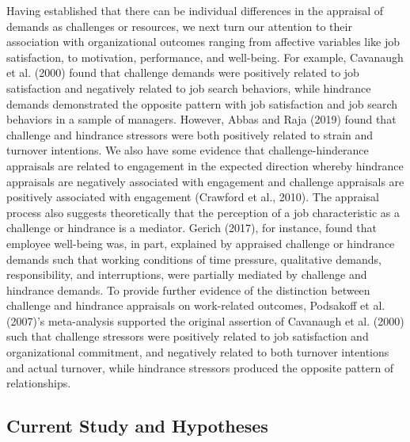 \documentclass[
  man]{apa6}
\begin{document}
Having established that there can be individual differences in the appraisal of demands as challenges or resources, we next turn our attention to their association with organizational outcomes ranging from affective variables like job satisfaction, to motivation, performance, and well-being. For example, Cavanaugh et al. (2000) found that challenge demands were positively related to job satisfaction and negatively related to job search behaviors, while hindrance demands demonstrated the opposite pattern with job satisfaction and job search behaviors in a sample of managers. However, Abbas and Raja (2019) found that challenge and hindrance stressors were both positively related to strain and turnover intentions. We also have some evidence that challenge-hinderance appraisals are related to engagement in the expected direction whereby hindrance appraisals are negatively associated with engagement and challenge appraisals are positively associated with engagement (Crawford et al., 2010). The appraisal process also suggests theoretically that the perception of a job characteristic as a challenge or hindrance is a mediator. Gerich (2017), for instance, found that employee well-being was, in part, explained by appraised challenge or hindrance demands such that working conditions of time pressure, qualitative demands, responsibility, and interruptions, were partially mediated by challenge and hindrance demands. To provide further evidence of the distinction between challenge and hindrance appraisals on work-related outcomes, Podsakoff et al. (2007)'s meta-analysis supported the original assertion of Cavanaugh et al. (2000) such that challenge stressors were positively related to job satisfaction and organizational commitment, and negatively related to both turnover intentions and actual turnover, while hindrance stressors produced the opposite pattern of relationships.

\hypertarget{current-study-and-hypotheses}{%
\subsection{Current Study and Hypotheses}\label{current-study-and-hypotheses}}
\end{document}
